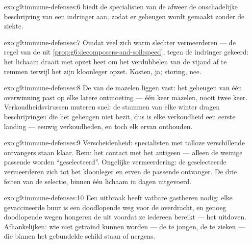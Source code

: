 \begin{solution}{exo:g9:immune-defenses:6}
 biedt de specialisten van de afweer de onschadelijke
beschrijving van een indringer aan, zodat er geheugen wordt gemaakt
zonder de ziekte.
\end{solution}

\begin{solution}{exo:g9:immune-defenses:7}
Omdat veel  zich warm slechter vermeerderen --- de
regel van de  uit
\cref{prop:g6:decomposers-and-soil:speed}, tegen de indringer
gekeerd: het lichaam draait met opzet heet om het verdubbelen van
de vijand af te remmen terwijl het zijn kloonleger opzet. Kosten,
ja; storing, nee.
\end{solution}

\begin{solution}{exo:g9:immune-defenses:8}
De  van de mazelen liggen vast: het geheugen van één
overwinning past op elke latere ontmoeting --- één keer mazelen,
nooit twee keer. Verkoudheidsvirussen muteren snel: de stammen van
elke winter dragen beschrijvingen die het geheugen niet bezit, dus
is elke verkoudheid een eerste landing --- eeuwig verkoudheden,
en toch elk ervan onthouden.
\end{solution}

\begin{solution}{exo:g9:immune-defenses:9}
Verscheidenheid: specialisten met talloze verschillende ontvangers
staan klaar. Rem: het contact met het antigeen --- alleen de weinige
passende worden ``geselecteerd''. Ongelijke vermeerdering: de
geselecteerde vermeerderen zich tot het kloonleger en erven de
passende ontvanger. De drie feiten van de selectie, binnen één
lichaam in dagen uitgevoerd.
\end{solution}

\begin{solution}{exo:g9:immune-defenses:10}
Een uitbraak heeft vatbare gastheren nodig: elke gevaccineerde buur
is een doodlopende weg voor de overdracht, en genoeg doodlopende
wegen hongeren de  uit voordat ze iedereen bereikt ---
het uitdoven. Afhankelijken: wie niet getraind kunnen worden --- de
te jongen, de te zieken --- die binnen het gebundelde schild staan
of nergens.
\end{solution}

